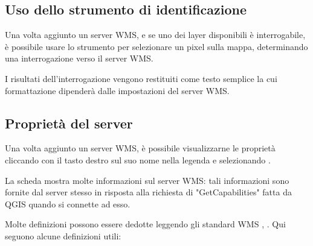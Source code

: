 \subsection{Uso dello strumento di identificazione}\label{sec:ogc-wms-identify}

Una volta aggiunto un server WMS, e se uno dei layer disponibili è
interrogabile, è possibile usare lo strumento
 per selezionare un pixel
sulla mappa, determinando una interrogazione verso il server WMS.

I risultati dell'interrogazione vengono restituiti come testo semplice la cui
formattazione dipenderà dalle impostazioni del server WMS.

\subsection{Proprietà del server}\label{sec:ogc-wms-properties}

Una volta aggiunto un server WMS, è possibile visualizzarne le proprietà
cliccando con il tasto destro sul suo nome nella legenda e selezionando
.


\label{sec:ogc-wms-properties-metadata}

La scheda  mostra molte informazioni sul server WMS: tali informazioni sono fornite dal server stesso 
in risposta alla richiesta di "GetCapabilities" fatta da QGIS quando si connette ad esso.

Molte definizioni possono essere dedotte leggendo gli standard WMS \cite{OGCWMS010101web}, \cite{OGCWMS010300web}. 
Qui seguono alcune definizioni utili:

